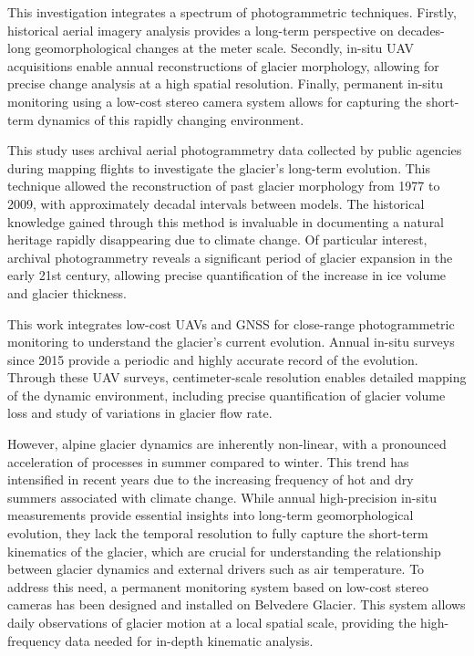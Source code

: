 This investigation integrates a spectrum of photogrammetric techniques.  
Firstly, historical aerial imagery analysis provides a long-term perspective on decades-long geomorphological changes at the meter scale.  
Secondly, in-situ UAV acquisitions enable annual reconstructions of glacier morphology, allowing for precise change analysis at a high spatial resolution.  
Finally, permanent in-situ monitoring using a low-cost stereo camera system allows for capturing the short-term dynamics of this rapidly changing environment.


This study uses archival aerial photogrammetry data collected by public agencies during mapping flights to investigate the glacier's long-term evolution.
This technique allowed the reconstruction of past glacier morphology from 1977 to 2009, with approximately decadal intervals between models.  
The historical knowledge gained through this method is invaluable in documenting a natural heritage rapidly disappearing due to climate change. 
Of particular interest, archival photogrammetry reveals a significant period of glacier expansion in the early 21st century, allowing precise quantification of the increase in ice volume and glacier thickness.

This work integrates low-cost UAVs and GNSS for close-range photogrammetric monitoring to understand the glacier's current evolution.
Annual in-situ surveys since 2015 provide a periodic and highly accurate record of the evolution. 
Through these UAV surveys, centimeter-scale resolution enables detailed mapping of the dynamic environment, including precise quantification of glacier volume loss and study of variations in glacier flow rate.

However, alpine glacier dynamics are inherently non-linear, with a pronounced acceleration of processes in summer compared to winter.  
This trend has intensified in recent years due to the increasing frequency of hot and dry summers associated with climate change. 
While annual high-precision in-situ measurements provide essential insights into long-term geomorphological evolution, they lack the temporal resolution to fully capture the short-term kinematics of the glacier, which are crucial for
understanding the relationship between glacier dynamics and external drivers such as air temperature.
To address this need, a permanent monitoring system based on low-cost stereo cameras has been designed and installed on Belvedere Glacier. 
This system allows daily observations of glacier motion at a local spatial scale,
providing the high-frequency data needed for in-depth kinematic analysis.

